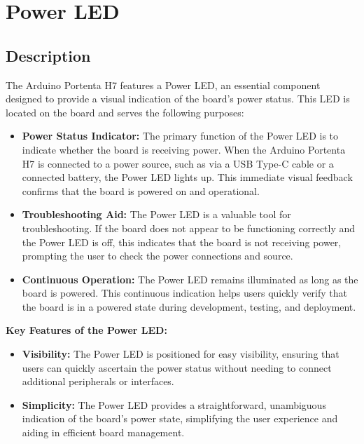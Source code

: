 \chapter{Power LED}

\section{Description}

The Arduino Portenta H7 features a Power LED, an essential component designed to provide a visual indication of the board's power status. This LED is located on the board and serves the following purposes: \cite{arduino_portenta_h7_datasheet:2025}

\begin{itemize}

\item \textbf{Power Status Indicator:} The primary function of the Power LED is to indicate whether the board is receiving power. When the Arduino Portenta H7 is connected to a power source, such as via a USB Type-C cable or a connected battery, the Power LED lights up. This immediate visual feedback confirms that the board is powered on and operational.

\item \textbf{Troubleshooting Aid:} The Power LED is a valuable tool for troubleshooting. If the board does not appear to be functioning correctly and the Power LED is off, this indicates that the board is not receiving power, prompting the user to check the power connections and source.

\item \textbf{Continuous Operation:} The Power LED remains illuminated as long as the board is powered. This continuous indication helps users quickly verify that the board is in a powered state during development, testing, and deployment.

\end{itemize}

\textbf{Key Features of the Power LED:}
\begin{itemize}
	\item \textbf{Visibility:} The Power LED is positioned for easy visibility, ensuring that users can quickly ascertain the power status without needing to connect additional peripherals or interfaces. \cite{arduino_portenta_h7_datasheet:2025}
	\item \textbf{Simplicity:} The Power LED provides a straightforward, unambiguous indication of the board's power state, simplifying the user experience and aiding in efficient board management.
\end{itemize}

